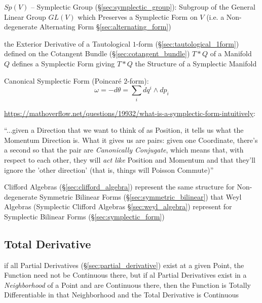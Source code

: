 {$Sp(V)$ -- Symplectic Group (\S\ref{sec:symplectic_group}): Subgroup of the
General Linear Group $GL(V)$ which Preserves a Symplectic Form on $V$ (i.e. a
Non-degenerate Alternating Form \S\ref{sec:alternating_form})

the Exterior Derivative of a Tautological $1$-form
(\S\ref{sec:tautological_1form}) defined on the Cotangent Bundle
(\S\ref{sec:cotangent_bundle}) $T * Q$ of a Manifold $Q$ defines a Symplectic
Form giving $T * Q$ the Structure of a Symplectic Manifold

Canonical Symplectic Form (Poincar\'e $2$-form):
\[
  \omega = -d\theta = \sum_i dq^i \wedge dp_i
\]

\asterism

\url{https://mathoverflow.net/questions/19932/what-is-a-symplectic-form-intuitively}:

``...given a Direction that we want to think of as Position, it tells us what
the Momentum Direction is. What it gives us are pairs: given one Coordinate,
there's a second so that the pair are \emph{Canonically Conjugate}, which means
that, with respect to each other, they will \emph{act like} Position and
Momentum and that they'll ignore the 'other direction' (that is, things will
Poisson Commute)''

\asterism

Clifford Algebras (\S\ref{sec:clifford_algebra}) represent the same structure
for Non-degenerate Symmetric Bilinear Forms (\S\ref{sec:symmetric_bilinear})
that Weyl Algebras (Symplectic Clifford Algebras \S\ref{sec:weyl_algebra})
represent for Symplectic Bilinear Forms (\S\ref{sec:symplectic_form})



\subsection{Total Derivative}\label{sec:total_derivative}

if all Partial Derivatives (\S\ref{sec:partial_derivative}) exist at a given
Point, the Function need not be Continuous there, but if al Partial Derivatives
exist in a \emph{Neighborhood} of a Point and are Continuous there, then the
Function is Totally Differentiable in that Neighborhood and the Total Derivative
is Continuous



}
